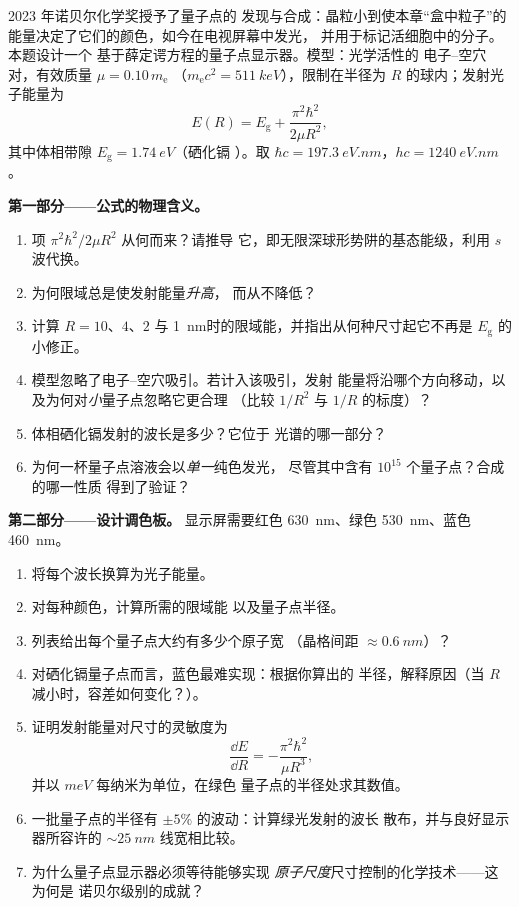 \begin{problem}\label{pb:b3:schrodinger-three-dimensions:1}
2023 年诺贝尔化学奖授予了量子点的
发现与合成：晶粒小到使本章“盒中粒子”的
能量决定了它们的颜色，如今在电视屏幕中发光，
并用于标记活细胞中的分子。本题设计一个
基于薛定谔方程的量子点显示器。模型：光学活性的
电子–空穴对，有效质量 $\mu = 0.10\,m_{\text{e}}$
（$m_{\text{e}}c^2 = \qty{511}{keV}$），限制在半径为
$R$ 的球内；发射光子能量为
\[
E(R) = E_{\text{g}} + \frac{\pi^2\hbar^2}{2\mu R^2} ,
\]
其中体相带隙 $E_{\text{g}} = \qty{1.74}{eV}$（硒化镉
）。取 $\hbar c = \qty{197.3}{eV.nm}$，$hc =
\qty{1240}{eV.nm}$。

\medskip\noindent\textbf{第一部分——公式的物理含义。}
\begin{enumerate}
  \item 项 $\pi^2\hbar^2/2\mu R^2$ 从何而来？请推导
        它，即无限深球形势阱的基态能级，利用
        $s$ 波代换。
  \item 为何限域总是使发射能量\emph{升高}，
        而从不降低？
  \item 计算 $R = 10$、$4$、$2$ 与
        \qty{1}{nm}时的限域能，并指出从何种尺寸起它不再是
        $E_{\text{g}}$ 的小修正。
  \item 模型忽略了电子–空穴吸引。若计入该吸引，发射
        能量将沿哪个方向移动，以及为何对\emph{小}量子点忽略它更合理
        （比较 $1/R^2$ 与
        $1/R$ 的标度）？
  \item 体相硒化镉发射的波长是多少？它位于
        光谱的哪一部分？
  \item 为何一杯量子点溶液会以\emph{单一}纯色发光，
        尽管其中含有 $10^{15}$ 个量子点？合成的哪一性质
        得到了验证？
\end{enumerate}

\medskip\noindent\textbf{第二部分——设计调色板。}
显示屏需要红色 \qty{630}{nm}、绿色 \qty{530}{nm}、蓝色
\qty{460}{nm}。
\begin{enumerate}[resume]
  \item 将每个波长换算为光子能量。
  \item 对每种颜色，计算所需的限域能
        以及量子点半径。
  \item 列表给出每个量子点大约有多少个原子宽
        （晶格间距 $\approx \qty{0.6}{nm}$）？
  \item 对硒化镉量子点而言，蓝色最难实现：根据你算出的
        半径，解释原因（当 $R$
        减小时，容差如何变化？）。
  \item 证明发射能量对尺寸的灵敏度为
        \[
        \frac{\dd E}{\dd R} = -\frac{\pi^2\hbar^2}{\mu R^3} ,
        \]
        并以 $\unit{meV}$ 每纳米为单位，在绿色
        量子点的半径处求其数值。
  \item 一批量子点的半径有 $\pm5\%$ 的波动：计算绿光发射的波长
        散布，并与良好显示器所容许的
        $\sim\qty{25}{nm}$ 线宽相比较。
  \item 为什么量子点显示器必须等待能够实现
        \emph{原子尺度}尺寸控制的化学技术——这为何是
        诺贝尔级别的成就？
\end{enumerate}


\end{problem}
